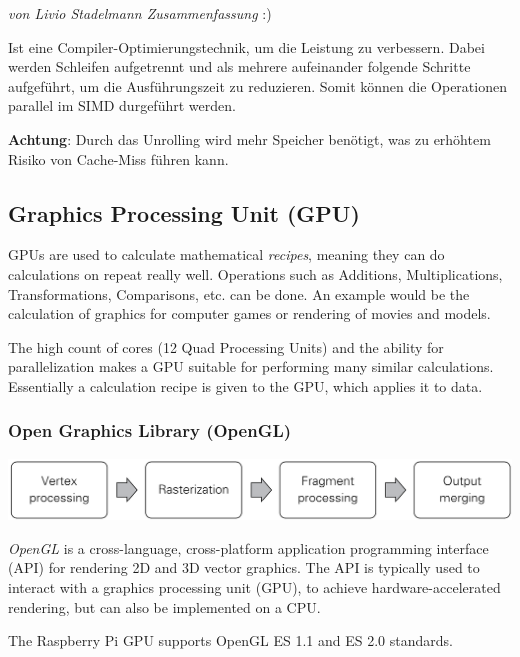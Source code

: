 \documentclass[
  10pt,
  a4paper,
]{article}
\begin{document}
\begin{multicols*}{2}
\begin{tcolorbox}
\emph{von Livio Stadelmann Zusammenfassung} :)

Ist eine Compiler-Optimierungstechnik, um die Leistung zu verbessern.
Dabei werden Schleifen aufgetrennt und als mehrere aufeinander folgende
Schritte aufgeführt, um die Ausführungszeit zu reduzieren. Somit können
die Operationen parallel im SIMD durgeführt werden.

\textbf{Achtung}: Durch das Unrolling wird mehr Speicher benötigt, was
zu erhöhtem Risiko von Cache-Miss führen kann.

\end{tcolorbox}

\subsection{Graphics Processing Unit
(GPU)}\label{graphics-processing-unit-gpu}

GPUs are used to calculate mathematical \emph{recipes}, meaning they can
do calculations on repeat really well. Operations such as Additions,
Multiplications, Transformations, Comparisons, etc. can be done. An
example would be the calculation of graphics for computer games or
rendering of movies and models.

The high count of cores (12 Quad Processing Units) and the ability for
parallelization makes a GPU suitable for performing many similar
calculations. Essentially a calculation recipe is given to the GPU,
which applies it to data.

\subsubsection{Open Graphics Library
(OpenGL)}\label{open-graphics-library-opengl}

\includegraphics{images/performance/image-27.png}

\emph{OpenGL} is a cross-language, cross-platform application
programming interface (API) for rendering 2D and 3D vector graphics. The
API is typically used to interact with a graphics processing unit (GPU),
to achieve hardware-accelerated rendering, but can also be implemented
on a CPU.

The Raspberry Pi GPU supports OpenGL ES 1.1 and ES 2.0 standards.


\end{multicols*}
\end{document}
